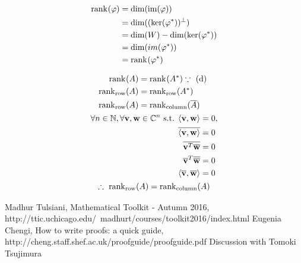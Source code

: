 \documentclass{mathtoolkit}
\newcommand\row{\mathrm{row}}
\newcommand\column{\mathrm{column}}
\begin{document}
\begin{p}
\begin{subp}
      \item
        \begin{align*}
          \rank{\varphi}
          & = \dim{\im{\varphi}} \\
          & = \dim{(\ker{\varphi^*}}^\perp) \\
          & = \dim{W} - \dim{\ker{\varphi^*}} \\
          & = \dim{im(\varphi^*}) \\
          & = \rank{\varphi^*}
        \end{align*}

      \item
        \begin{gather*}
          \begin{aligned}
            \rank{A} & = \rank{A^*} \because \text{(d)} \\
            \rank[\row]{A} & = \rank[\row]{A^*} \\
            \rank[\row]{A} & = \rank[\column]{\conj{A}}
          \end{aligned} \\
          \begin{aligned}
            \forall n \in \field{N}, \forall \vec{v}, \vec{w} \in \field{C}^n
            \st \ip{\vec{v}}{\vec{w}} & = 0, \\
            \conj{\ip{\vec{v}}{\vec{w}}} & = 0 \\
            \conj{\vec{v}^T \conj{\vec{w}}} & = 0 \\
            \conj{\vec{v}}^T \conj{\conj{\vec{w}}} & = 0 \\
            \ip{\conj{\vec{v}}}{\conj{\vec{w}}} & = 0
          \end{aligned} \\
          \therefore \rank[\row]{A} = \rank[\column]{A}
        \end{gather*}
    \end{subp}
\end{p}

\begin{thebibliography}{9}
    Madhur Tulsiani,
    Mathematical Toolkit - Autumn 2016, \\
    http://ttic.uchicago.edu/~madhurt/courses/toolkit2016/index.html
    Eugenia Chengi,
    How to write proofs: a quick guide, \\
    http://cheng.staff.shef.ac.uk/proofguide/proofguide.pdf
 Discussion with Tomoki Tsujimura
\end{thebibliography}
\end{document}
